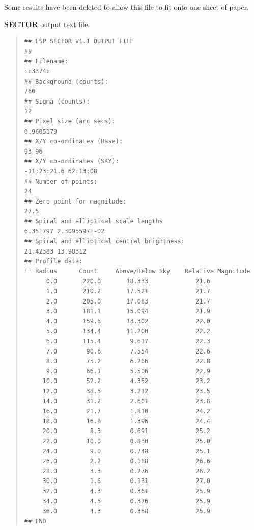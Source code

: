 \documentclass[twoside,11pt]{article}
\newenvironment{myquote}{\begin{quote}\begin{small}}{\end{small}\end{quote}}
\begin{document}
Some results have been deleted to allow this file to fit onto
one sheet of paper.

\newpage
\textbf{SECTOR} output text file.

\begin{myquote}
\begin{verbatim}
## ESP SECTOR V1.1 OUTPUT FILE 
##
## Filename: 
ic3374c                                                   
## Background (counts):
760
## Sigma (counts):
12
## Pixel size (arc secs):
0.9605179
## X/Y co-ordinates (Base):
93 96
## X/Y co-ordinates (SKY):
-11:23:21.6 62:13:08
## Number of points:
24
## Zero point for magnitude:
27.5
## Spiral and elliptical scale lengths 
6.351797 2.3095597E-02
## Spiral and elliptical central brightness:
21.42383 13.98312
## Profile data:
!! Radius      Count     Above/Below Sky    Relative Magnitude 
      0.0       220.0       18.333             21.6                             
      1.0       210.2       17.521             21.7                             
      2.0       205.0       17.083             21.7                             
      3.0       181.1       15.094             21.9                             
      4.0       159.6       13.302             22.0                             
      5.0       134.4       11.200             22.2                             
      6.0       115.4        9.617             22.3                             
      7.0        90.6        7.554             22.6                             
      8.0        75.2        6.266             22.8                             
      9.0        66.1        5.506             22.9                             
     10.0        52.2        4.352             23.2                             
     12.0        38.5        3.212             23.5                             
     14.0        31.2        2.601             23.8                             
     16.0        21.7        1.810             24.2                             
     18.0        16.8        1.396             24.4                             
     20.0         8.3        0.691             25.2                             
     22.0        10.0        0.830             25.0                             
     24.0         9.0        0.748             25.1                             
     26.0         2.2        0.188             26.6                             
     28.0         3.3        0.276             26.2                             
     30.0         1.6        0.131             27.0                             
     32.0         4.3        0.361             25.9                             
     34.0         4.5        0.376             25.9                             
     36.0         4.3        0.358             25.9                             
## END 
\end{verbatim}
\end{myquote}
\end{document}
